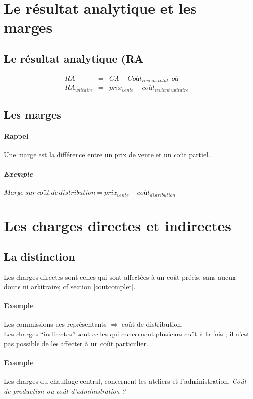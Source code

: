 \documentclass[12pt,a4paper,openany]{report}
\begin{document}
	\section{Le résultat analytique et les marges}
	 \subsection{Le résultat analytique (RA}
	 \begin{eqnarray*}
		 RA &=& CA - Coût_{revient~total} ~ ~ où\\ 
		 RA_{unitaire} &=& prix_{vente} - coût_{revient~unitaire}
	 \end{eqnarray*}
	 \subsection{Les marges}
	 \paragraph{Rappel} Une marge est la différence entre un prix de vente et un coût partiel.
	 \subparagraph{Exemple} $Marge~sur~coût~de~distribution = prix_{vente} - coût_{distribution} $
	 \section{Les charges directes et indirectes}
	 \subsection{La distinction}
	 Les charges directes sont celles qui sont affectées à un coût précis, sans aucun doute ni arbitraire; cf section \ref{coutcomplet}.
	 \paragraph{Exemple} Les commissions des représentants $\Rightarrow$ coût de distribution.\\
	 Les charges ``indirectes'' sont celles qui concernent plusieurs coût à la fois ; il n'est pas possible de les
	 affecter à un coût particulier.
	 \paragraph{Exemple} Les charges du chauffage central, concernent les ateliers et l'administration. 
	 \textit{ Coût de production ou coût d'administration ? }
\end{document}

